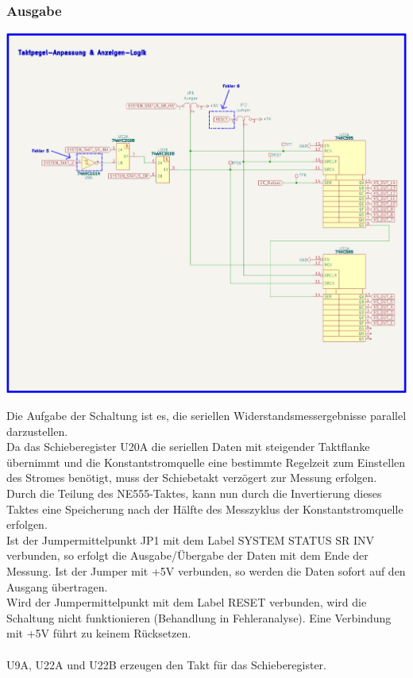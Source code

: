 \subsubsection{Ausgabe}
\begin{center}
\includegraphics[width=15cm]{Bilder/Anzeige-Logik.png}
\end{center}

Die Aufgabe der Schaltung ist es, die seriellen Widerstandsmessergebnisse parallel darzustellen. 
\\
Da das Schieberegister U20A die seriellen Daten mit steigender Taktflanke übernimmt und die Konstantstromquelle eine bestimmte Regelzeit zum Einstellen des Stromes benötigt, muss der Schiebetakt verzögert zur Messung erfolgen. Durch die Teilung des NE555-Taktes, kann nun durch die Invertierung dieses Taktes eine Speicherung nach der Hälfte des Messzyklus der Konstantstromquelle erfolgen.
\\
Ist der Jumpermittelpunkt JP1 mit dem Label \glqq SYSTEM STATUS SR INV \grqq{} verbunden, so erfolgt die Ausgabe/Übergabe der Daten mit dem Ende der Messung. Ist der Jumper mit +5V verbunden, so werden die Daten sofort auf den Ausgang übertragen.
\\
Wird der Jumpermittelpunkt mit dem Label \glqq RESET \grqq{} verbunden, wird die Schaltung nicht funktionieren (Behandlung in Fehleranalyse). Eine Verbindung mit +5V führt zu keinem Rücksetzen.
\\
\\
U9A, U22A und U22B erzeugen den Takt für das Schieberegister. 

